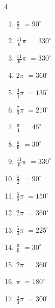 \begin{multicols}{4}
\begin{enumerate}
  \item $\displaystyle \frac{\pi}{2}$
        $\displaystyle =90^{\circ}$

  \item $\displaystyle \frac{11}{6}\pi$
        $\displaystyle =330^{\circ}$

  \item $\displaystyle \frac{11}{6}\pi$
        $\displaystyle =330^{\circ}$

  \item $\displaystyle 2\pi$
        $\displaystyle =360^{\circ}$

  \item $\displaystyle \frac{3}{4}\pi$
        $\displaystyle =135^{\circ}$

  \item $\displaystyle \frac{7}{6}\pi$
        $\displaystyle =210^{\circ}$

  \item $\displaystyle \frac{\pi}{4}$
        $\displaystyle =45^{\circ}$

  \item $\displaystyle \frac{\pi}{6}$
        $\displaystyle =30^{\circ}$

  \item $\displaystyle \frac{11}{6}\pi$
        $\displaystyle =330^{\circ}$

  \item $\displaystyle \frac{\pi}{2}$
        $\displaystyle =90^{\circ}$

  \item $\displaystyle \frac{5}{6}\pi$
        $\displaystyle =150^{\circ}$

  \item $\displaystyle 2\pi$
        $\displaystyle =360^{\circ}$

  \item $\displaystyle \frac{5}{4}\pi$
        $\displaystyle =225^{\circ}$

  \item $\displaystyle \frac{\pi}{6}$
        $\displaystyle =30^{\circ}$

  \item $\displaystyle 2\pi$
        $\displaystyle =360^{\circ}$

  \item $\displaystyle \pi$
        $\displaystyle =180^{\circ}$

\columnbreak %

  \item $\displaystyle \frac{5}{3}\pi$
        $\displaystyle =300^{\circ}$


\end{enumerate}
\end{multicols}
